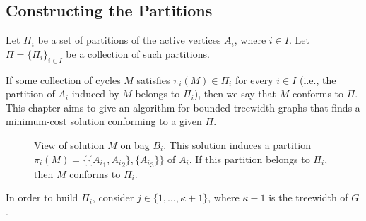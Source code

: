 \subsection{Constructing the Partitions}

Let \(\Pi_i\) be a set of partitions of the active vertices \(A_i\), where $i \in I$.
Let \(\Pi = \{\Pi_i\}_{i \in I}\) be a collection of such partitions.

If some collection of cycles \(M\) satisfies \(\pi_i(M) \in \Pi_i\) for every \(i \in I\) (i.e., the partition of \(A_i\) induced by \(M\) belongs to \(\Pi_i\)), then we say that \(M\) conforms to \(\Pi\). This chapter aims to give an algorithm for bounded treewidth graphs that finds a minimum-cost solution conforming to a given \(\Pi\).

\begin{figure}[H]
    \centering
{}
    \caption{View of solution \(M\) on bag \(B_i\). This solution induces a partition \(\pi_i(M) = \{\{{A_i}_1, {A_i}_2\}, \{{A_i}_3\}\}\) of \(A_i\). If this partition belongs to \(\Pi_i\), then \(M\) conforms to \(\Pi_i\).}
    \label{fig:example_Ai_partition}
\end{figure}

In order to build \(\Pi_i\), consider \(j \in \{1, \dots, \kappa + 1\}\), where \(\kappa - 1\) is the treewidth of \(G\). 

